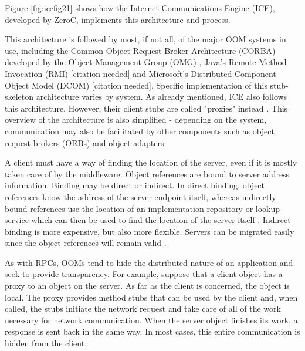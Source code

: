 \documentclass{acm_proc_article-sp}
\begin{document}
Figure \ref{fig:icefig21} shows how the Internet Communications Engine (ICE), developed by ZeroC, implements this architecture and process.



This architecture is followed by most, if not all, of the major OOM systems in use, including the Common Object Request Broker Architecture (CORBA) developed by the Object Management Group (OMG) \cite{Emmerich:2007p8368}, Java's Remote Method Invocation (RMI) [citation needed] and Microsoft's Distributed Component Object Model (DCOM) [citation needed].  Specific implementation of this stub-skeleton architecture varies by system.  As already mentioned, ICE also follows this architecture.  However, their client stubs are called "proxies" instead \cite{icemanual}.  This overview of the architecture is also simplified - depending on the system, communication may also be facilitated by other components such as object request brokers (ORBs) and object adapters.

A client must have a way of finding the location of the server, even if it is mostly taken care of by the middleware.  Object references are bound to server address information.  Binding may be direct or indirect.  In direct binding, object references know the address of the server endpoint itself, whereas indirectly bound references use the location of an implementation repository or lookup service which can then be used to find the location of the server itself \cite{Henning:2004p8372}.  Indirect binding is more expensive, but also more flexible.  Servers can be migrated easily since the object references will remain valid \cite{icemanual}.

As with RPCs, OOMs tend to hide the distributed nature of an application and seek to provide transparency.  For example, suppose that a client object has a proxy to an object on the server.  As far as the client is concerned, the object is local.  The proxy provides method stubs that can be used by the client and, when called, the stubs initiate the network request and take care of all of the work necessary for network communication.  When the server object finishes its work, a response is sent back in the same way.  In most cases, this entire communication is hidden from the client.
\end{document}
